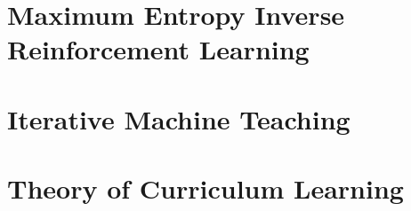 \section{Maximum Entropy Inverse Reinforcement Learning}


\section{Iterative Machine Teaching}


\section{Theory of Curriculum Learning}